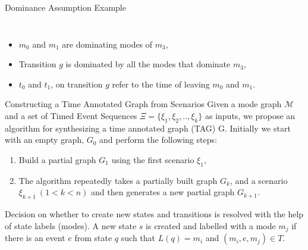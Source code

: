 \documentclass[10pt]{beamer}
\theoremstyle{plain}
\theoremstyle{definition}
\begin{document}
\begin{frame}{Dominance Assumption Example}
\begin{columns}
\begin{column}{0.5\textwidth}
\begin{figure}
\begin{adjustbox}{max totalsize={.80\textwidth}{.80\textheight},center}
			\end{adjustbox}
			\end{figure} 
		\end{column}
	\end{columns}
	\begin{itemize}
		\item $m_0$ and $m_1$ are dominating modes of $m_3$,
		\item Transition $g$ is dominated by all the modes that dominate $m_3$,
		\item $t_0$ and $t_1$, on transition $g$ refer to the time of leaving $m_0$ and $m_1$.
	\end{itemize}
\end{frame}

\begin{frame}{Constructing a Time Annotated Graph from Scenarios}
	Given a mode graph $\mathcal{M}$ and a set of Timed Event Sequences  $\Xi = \{\xi_1,\xi_2,..,\xi_k\}$ as inputs, we propose an algorithm for synthesizing a time annotated graph (TAG) G. Initially we start with an empty graph, $G_0$ and perform the following steps:
	\begin{enumerate}
		\item Build a partial graph $G_1$ using the first scenario $\xi_1$,
		\item The algorithm repeatedly takes a partially built graph $G_k$, and a scenario $\xi_{k+1} ~(1 < k < n)$ and then generates a new partial graph $G_{k+1}$.
	\end{enumerate}
	Decision on whether to create new states and transitions is resolved with the help of state labels (modes).
	A new state $s$ is created and labelled with a mode $m_j$ if there is an event $e$ from state $q$ such that $L(q) = m_i$ and $(m_i,e,m_j) \in T$.
\end{frame}
\end{document}
